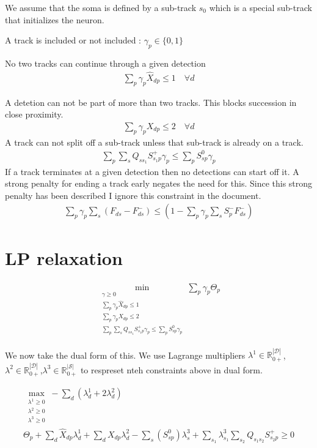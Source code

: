 \documentclass{article}
\begin{document}
We assume that the soma is defined by a sub-track $s_0$ which is a special sub-track that initializes the neuron.  
 
 A track is included or not included :  $\gamma_p \in \{0,1\}$
 
 No two tracks can continue through a given detection
 \begin{align}
 \sum_p \gamma_p\hat{X}_{dp}\leq 1 \quad \forall d
 \end{align}
 
 A detetion can not be part of more than two tracks.  This blocks succession in close proximity.  
  \begin{align}
 \sum_p \gamma_p X_{dp}\leq 2 \quad \forall d
 \end{align}
%
 A track can not split off a sub-track unless that sub-track is already on a track. 
 \begin{align}
 \sum_p \sum_{s}Q_{ss_1}S^+_{s_1p}\gamma_p \leq \sum_p S^0_{sp}\gamma_p %
 \end{align}
 If a track terminates at a given detection then no detections can start off it.  A strong penalty for ending a track early negates the need for this.  Since this strong penalty has been described  I ignore this constraint in the document.  
 \begin{align}
\sum_p\gamma_p\sum_s(F_{ds}-F^-_{ds}) \leq (1-\sum_p\gamma_p\sum_s S^-_pF^-_{ds})
 \end{align}
 
 \section{LP relaxation}
 
  \begin{align}
 \min_{\substack{\gamma \geq 0\\   \sum_p \gamma_p\hat{X}_{dp}\leq 1\\ \sum_p \gamma_p X_{dp}\leq 2 \\ \sum_p \sum_{s}Q_{ss_1}S^+_{s_1p}\gamma_p \leq \sum_p S^0_{sp}\gamma_p }}\sum_p \gamma_p\Theta_p
 \end{align}
 
 We now take the dual form of this.  We use Lagrange multipliers $\lambda^1 \in \mathbb{R}_{0+}^{|\mathcal{D}|}$,$\lambda^2 \in \mathbb{R}_{0+}^{|\mathcal{D}|}$,$\lambda^3 \in \mathbb{R}_{0+}^{|\mathcal{S}|}$ to respreset nteh constraints above in dual form.  
 
 \begin{align}
 \max_{\substack{\lambda^1 \geq 0\\ \lambda^2 \geq 0 \\ \lambda^3 \geq 0 }}-\sum_d(\lambda^1_d+2\lambda^2_d) \\
 \Theta_p +\sum_d \hat{X}_{dp}\lambda^1_d+\sum_d X_{dp}\lambda^2_d -\sum_{s}(S^0_{sp})\lambda^3_s+ \sum_{s_1} \lambda^3_{s_1}\sum_{s_2}Q_{s_1s_2}S^+_{s_2p}\geq 0
 \end{align}
 
\end{document}
